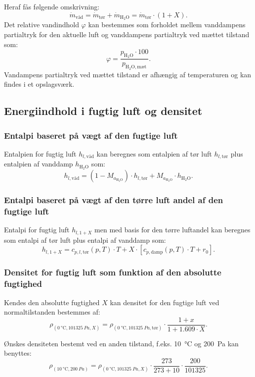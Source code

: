 Heraf fås følgende omskrivning:
\[ 
\dot{m}_{\text{våd}} = \dot{m}_{\text{tør}} + \dot{m}_{\mathrm{H}_2 \mathrm{O}} = \dot{m}_{\text{tør}} \cdot (1+X)
.\]
Det relative vandindhold $\varphi$ kan bestemmes som forholdet mellem vanddampens partialtryk for den aktuelle luft og vanddampens partialtryk ved mættet tilstand som:
\[ 
\varphi = \frac{p_{\mathrm{H}_2 \mathrm{O} } \cdot  100}{p_{\mathrm{H}_2 \mathrm{O}, \text{mæt}}}
.\]
Vandampens partialtryk ved mættet tilstand er afhængig af temperaturen og kan findes i et opslagsværk. 

\subsection{Energiindhold i fugtig luft og densitet}

\subsubsection{Entalpi baseret på vægt af den fugtige luft}
Entalpien for fugtig luft $h_{l, \text{våd}}$ kan beregnes som entalpien af tør luft $h_{l, \text{tør}}$ plus entalpien af vanddamp $h_{\mathrm{H}_2 \mathrm{O}}$ som:
\[ 
h_{l, \text{våd}} = (1 - M_{a_{\mathrm{H}_2 \mathrm{O}}}) \cdot h_{l, \text{tør}} + M_{a_{\mathrm{H}_2 \mathrm{O}}} \cdot h_{\mathrm{H}_2 \mathrm{O}}
.\]

\subsubsection{Entalpi baseret på vægt af den tørre luft andel af den fugtige luft}
Entalpi for fugtig luft $h_{l, 1+X}$ men med basis for den tørre luftandel kan beregnes som entalpi af tør luft plus entalpi af vanddamp som:
\[ 
h_{l, 1+X} = c_{p,l, \text{tør}}(p,T) \cdot T + X \cdot \left[ c_{p, \mathrm{damp}}(p,T) \cdot T + r_0 \right]
.\]

\subsubsection{Densitet for fugtig luft som funktion af den absolutte fugtighed}
Kendes den absolutte fugtighed $X$ kan densitet for den fugtige luft ved normaltilstanden bestemmes af:
\[ 
\rho_{(\qty{0}{\celsius}, \qty{101325}{Pa}, X)} = \rho_{(\qty{0}{\celsius}, \qty{101325}{Pa},\text{tør})} \cdot \frac{1+x}{1+\num{1,609} \cdot X}
.\]

Ønskes densiteten bestemt ved en anden tilstand, f.eks. \qty{10}{\celsius} og \qty{200}{Pa} kan benyttes:
\[ 
\rho_{(\qty{10}{\celsius}, \qty{200}{Pa} )} = \rho_{(\qty{0}{\celsius}, \qty{101325}{Pa}, X)} \cdot \frac{273}{273+10} \cdot \frac{200}{\num{101325} }
.\]

